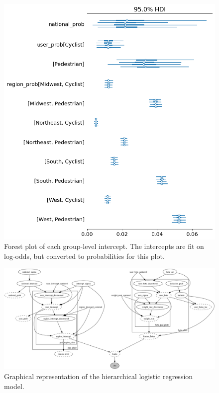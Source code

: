 \documentclass[12pt]{article}
\begin{document}
\begin{figure}[h]
\centering
    \includegraphics[width=\textwidth]{images/prob_intercepts.png}
    \caption{Forest plot of each group-level intercept. The intercepts are fit on log-odds,
    but converted to probabilities for this plot.}
    \label{fig:prob_intercepts}
\end{figure}



\begin{figure}[h]
    \centering
    \includegraphics[width=\textwidth]{images/model_graph.png}
    \caption{Graphical representation of the hierarchical logistic regression model.}
    \label{fig:model_graph}
\end{figure}
\end{document}
